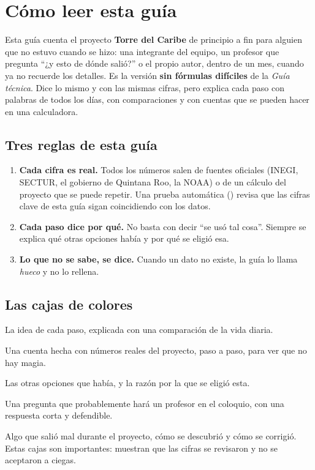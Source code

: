\chapter*{Cómo leer esta guía}

Esta guía cuenta el proyecto \textbf{Torre del Caribe} de principio a fin para alguien que no estuvo cuando se hizo: una
integrante del equipo, un profesor que pregunta ``¿y esto de dónde salió?'' o el propio autor, dentro de un mes, cuando
ya no recuerde los detalles. Es la versión \textbf{sin fórmulas difíciles} de la \emph{Guía técnica}. Dice lo mismo y con
las mismas cifras, pero explica cada paso con palabras de todos los días, con comparaciones y con cuentas que se pueden
hacer en una calculadora.

\section*{Tres reglas de esta guía}
\begin{enumerate}
\item \textbf{Cada cifra es real.} Todos los números salen de fuentes oficiales (INEGI, SECTUR, el gobierno de Quintana
  Roo, la NOAA) o de un cálculo del proyecto que se puede repetir. Una prueba automática ()
  revisa que las cifras clave de esta guía sigan coincidiendo con los datos.
\item \textbf{Cada paso dice por qué.} No basta con decir ``se usó tal cosa''. Siempre se explica qué otras opciones había y
  por qué se eligió esa.
\item \textbf{Lo que no se sabe, se dice.} Cuando un dato no existe, la guía lo llama \emph{hueco} y no lo rellena.
\end{enumerate}

\section*{Las cajas de colores}
\begin{intuicion}
La idea de cada paso, explicada con una comparación de la vida diaria.
\end{intuicion}
\begin{ejemplo}
Una cuenta hecha con números reales del proyecto, paso a paso, para ver que no hay magia.
\end{ejemplo}
\begin{porque}
Las otras opciones que había, y la razón por la que se eligió esta.
\end{porque}
\begin{teprofe}
Una pregunta que probablemente hará un profesor en el coloquio, con una respuesta corta y defendible.
\end{teprofe}
\begin{error}
Algo que salió mal durante el proyecto, cómo se descubrió y cómo se corrigió. Estas cajas son importantes: muestran que
las cifras se revisaron y no se aceptaron a ciegas.
\end{error}

